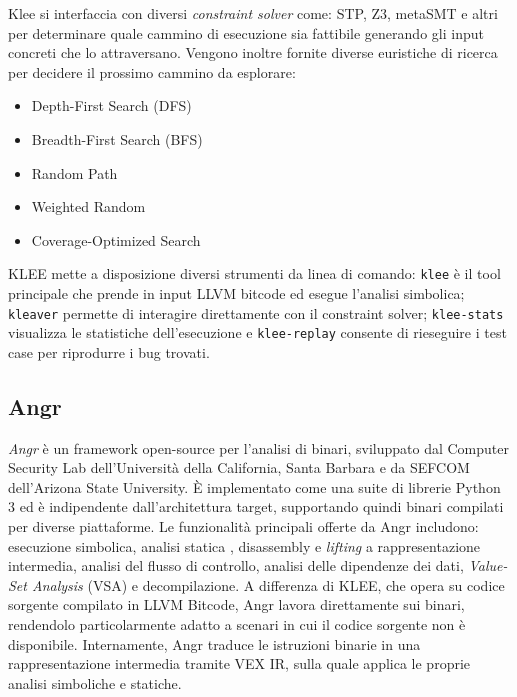     Klee si interfaccia con diversi \textit{constraint solver} come: STP, Z3, metaSMT e altri per determinare quale cammino di esecuzione sia fattibile generando gli input concreti che lo attraversano. Vengono inoltre fornite diverse euristiche di ricerca per decidere il prossimo cammino da esplorare:
    \begin{itemize}[noitemsep]
        \item Depth-First Search (DFS)
        \item Breadth-First Search (BFS)
        \item Random Path
        \item Weighted Random
        \item Coverage-Optimized Search
    \end{itemize}

    KLEE mette a disposizione diversi strumenti da linea di comando: \texttt{klee} è il tool principale che prende in input LLVM bitcode  ed esegue l'analisi simbolica; \texttt{kleaver} permette di interagire direttamente con il constraint solver; \texttt{klee-stats} visualizza le statistiche dell'esecuzione e \texttt{klee-replay} 
    consente di rieseguire i test case per riprodurre i bug trovati.~\cite{klee}
\subsection{Angr}
\label{subsec:angr}
    \textit{Angr} è un framework open-source per l'analisi di binari, sviluppato 
    dal Computer Security Lab dell'Università della California, Santa Barbara e da 
    SEFCOM dell'Arizona State University. È implementato come una suite di librerie 
    Python 3 ed è indipendente dall'architettura target, supportando quindi binari 
    compilati per diverse piattaforme. Le funzionalità principali offerte da Angr 
    includono: esecuzione simbolica, analisi statica , disassembly e 
    \textit{lifting} a rappresentazione intermedia, analisi del flusso di controllo, 
    analisi delle dipendenze dei dati, \textit{Value-Set Analysis} (VSA) e 
    decompilazione. A differenza di KLEE, che opera su codice sorgente compilato 
    in LLVM Bitcode, Angr lavora direttamente sui binari, rendendolo particolarmente 
    adatto a scenari in cui il codice sorgente non è disponibile. Internamente, 
    Angr traduce le istruzioni binarie in una rappresentazione intermedia tramite 
    VEX IR, sulla quale applica le proprie analisi simboliche e statiche.
